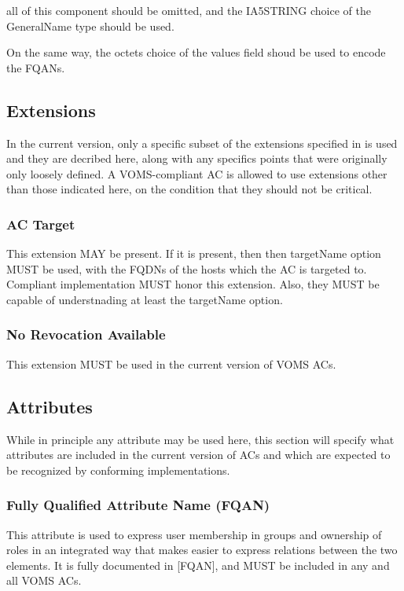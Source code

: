 \documentclass[a4]{article}
\begin{document}
all of this component should be omitted, and the IA5STRING
choice of the GeneralName type should be used.

On the same way, the octets choice of the values field shoud be used
to encode the FQANs.

\subsection{Extensions}

In the current version, only a specific subset of the extensions
specified in \cite{rfc3281} is used and they are decribed here, along with
any specifics points that were originally only loosely defined.  A
VOMS-compliant AC is allowed to use extensions other than those
indicated here, on the condition that they should not be critical.

\subsubsection{AC Target}

This extension MAY be present. If it is present, then then targetName
option MUST be used, with the FQDNs of the hosts which the AC is
targeted to.  Compliant implementation MUST honor this extension.
Also, they MUST be capable of understnading at least the targetName
option.

\subsubsection{No Revocation Available}

This extension MUST be used in the current version of VOMS ACs.

\subsection{Attributes}

While in principle any attribute may be used here, this section will
specify what attributes are included in the current version of ACs and
which are expected to be recognized by conforming implementations.

\subsubsection{Fully Qualified Attribute Name (FQAN)}

This attribute is used to express user membership in groups and
ownership of roles in an integrated way that makes easier to express
relations between the two elements.  It is fully documented in [FQAN],
and MUST be included in any and all VOMS ACs.
\end{document}
